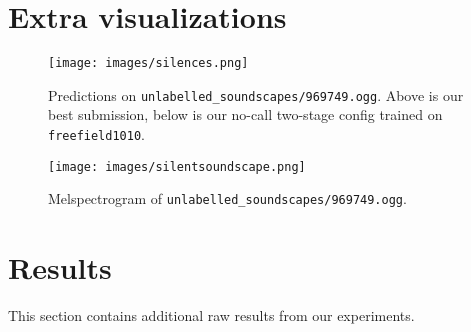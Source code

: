 \appendix

\pagebreak
\section{Extra visualizations}

\begin{figure}[h]
    \centering
    \texttt{[image: images/silences.png]}
    \caption{Predictions on \texttt{unlabelled\_soundscapes/969749.ogg}. Above is our best submission, below is our no-call two-stage config trained on \texttt{freefield1010}.}
    \label{fig:silentpreds}
\end{figure}


\begin{figure}[h]
    \centering
    \texttt{[image: images/silentsoundscape.png]}
    \caption{Melspectrogram of \texttt{unlabelled\_soundscapes/969749.ogg}.}
    \label{fig:silent}
\end{figure}

\pagebreak
\section{Results}

This section contains additional raw results from our experiments. 

